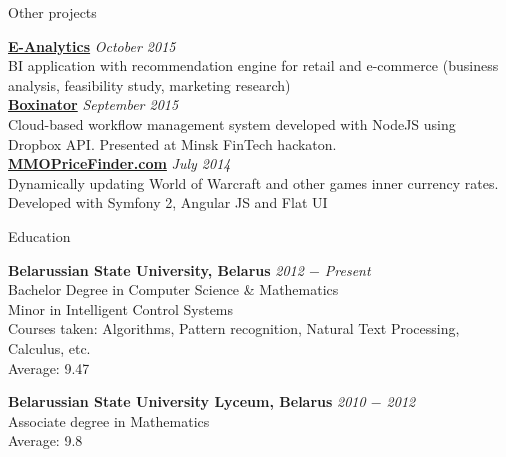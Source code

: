 \documentclass{resume} %
\begin{document}
\clearpage


\begin{rSection}{Other projects}

{\bf \href{http://pirateminds.com/e-analytics}{E-Analytics}} \hfill {\em October 2015} \\ 
BI application with recommendation engine for retail and e-commerce (business analysis, feasibility study, marketing research) \\

{\bf \href{http://boxinator.xyz}{Boxinator}} \hfill {\em September 2015} \\ 
Cloud-based workflow management system developed with NodeJS using Dropbox API. Presented at Minsk FinTech hackaton. \\

{\bf \href{http://mmopricefinder.com}{MMOPriceFinder.com}} \hfill {\em July 2014} \\ 
Dynamically updating World of Warcraft and other games inner currency rates. Developed with Symfony 2, Angular JS and Flat UI \\

\end{rSection}



\begin{rSection}{Education}

{\bf Belarussian State University, Belarus} \hfill {\em 2012 $-$ Present} \\ 
Bachelor Degree in Computer Science \& Mathematics \\
Minor in Intelligent Control Systems \smallskip \\
Courses taken: Algorithms, Pattern recognition, Natural Text Processing, Calculus, etc. \smallskip \\
Average: 9.47

{\bf Belarussian State University Lyceum, Belarus} \hfill {\em 2010 $-$ 2012} \\ 
Associate degree in Mathematics \\
Average: 9.8

\end{rSection}
\end{document}
